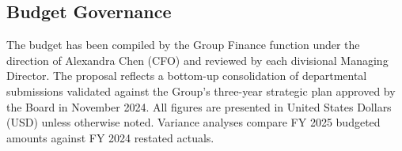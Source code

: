 \subsection{Budget Governance}

The budget has been compiled by the Group Finance function under the direction of
Alexandra Chen (CFO) and reviewed by each divisional Managing Director. The proposal
reflects a bottom-up consolidation of departmental submissions validated against the
Group's three-year strategic plan approved by the Board in November 2024.
All figures are presented in United States Dollars (USD) unless otherwise noted.
Variance analyses compare FY 2025 budgeted amounts against FY 2024 restated actuals.
